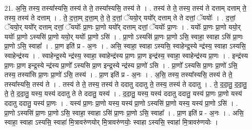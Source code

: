 \documentclass[17pt]{extarticle}
\begin{document}
21. अ॒सि॒ तस्य॒ तस्या᳚स्यसि॒ तस्य॑ ते ते॒ तस्या᳚स्यसि॒ तस्य॑ ते । . तस्य॑ ते ते॒ तस्य॒ तस्य॑ ते दत्ताम् दत्ताम् ते॒ तस्य॒ तस्य॑ ते दत्ताम् । . ते॒ द॒त्ता॒म् द॒त्ता॒म् ते॒ ते॒ द॒त्तां॒ ॅययो॒र् ययो᳚र् दत्ताम् ते ते दत्तां॒ ॅययोः᳚ । . द॒त्तां॒ ॅययो॒र् ययो᳚र् दत्ताम् दत्तां॒ ॅययोः᳚ प्रा॒णः प्रा॒णो ययो᳚र् दत्ताम् दत्तां॒ ॅययोः᳚ प्रा॒णः । . ययोः᳚ प्रा॒णः प्रा॒णो ययो॒र् ययोः᳚ प्रा॒णो ऽस्यसि॑ प्रा॒णो ययो॒र् ययोः᳚ प्रा॒णो ऽसि॑ । . प्रा॒णो ऽस्यसि॑ प्रा॒णः प्रा॒णो ऽसि॒ स्वाहा॒ स्वाहा ऽसि॑ प्रा॒णः प्रा॒णो ऽसि॒ स्वाहा᳚ । . प्रा॒ण इति॑ प्र - अ॒नः । . असि॒ स्वाहा॒ स्वाहा ऽस्यसि॒ स्वाहेन्द्र॒स्ये न्द्र॑स्य॒ स्वाहा ऽस्यसि॒ स्वाहेन्द्र॑स्य । . स्वाहेन्द्र॒स्ये न्द्र॑स्य॒ स्वाहा॒ स्वाहेन्द्र॑स्य प्रा॒णः प्रा॒ण इन्द्र॑स्य॒ स्वाहा॒ स्वाहेन्द्र॑स्य प्रा॒णः । . इन्द्र॑स्य प्रा॒णः प्रा॒ण इन्द्र॒स्ये न्द्र॑स्य प्रा॒णो᳚ ऽस्यसि प्रा॒ण इन्द्र॒स्ये न्द्र॑स्य प्रा॒णो॑ ऽसि । . प्रा॒णो᳚ ऽस्यसि प्रा॒णः प्रा॒णो॑ ऽसि॒ तस्य॒ तस्या॑सि प्रा॒णः प्रा॒णो॑ ऽसि॒ तस्य॑ । . प्रा॒ण इति॑ प्र - अ॒नः । . अ॒सि॒ तस्य॒ तस्या᳚स्यसि॒ तस्य॑ ते ते॒ तस्या᳚स्यसि॒ तस्य॑ ते । . तस्य॑ ते ते॒ तस्य॒ तस्य॑ ते ददातु ददातु ते॒ तस्य॒ तस्य॑ ते ददातु । . ते॒ द॒दा॒तु॒ द॒दा॒तु॒ ते॒ ते॒ द॒दा॒तु॒ यस्य॒ यस्य॑ ददातु ते ते ददातु॒ यस्य॑ । . द॒दा॒तु॒ यस्य॒ यस्य॑ ददातु ददातु॒ यस्य॑ प्रा॒णः प्रा॒णो यस्य॑ ददातु ददातु॒ यस्य॑ प्रा॒णः । . यस्य॑ प्रा॒णः प्रा॒णो यस्य॒ यस्य॑ प्रा॒णो ऽस्यसि॑ प्रा॒णो यस्य॒ यस्य॑ प्रा॒णो ऽसि॑ । . प्रा॒णो ऽस्यसि॑ प्रा॒णः प्रा॒णो ऽसि॒ स्वाहा॒ स्वाहा ऽसि॑ प्रा॒णः प्रा॒णो ऽसि॒ स्वाहा᳚ । . प्रा॒ण इति॑ प्र - अ॒नः । . असि॒ स्वाहा॒ स्वाहा ऽस्यसि॒ स्वाहा॑ मि॒त्रावरु॑णयोर् मि॒त्रावरु॑णयोः॒ स्वाहा ऽस्यसि॒ स्वाहा॑ मि॒त्रावरु॑णयोः । \newline
\end{document}
